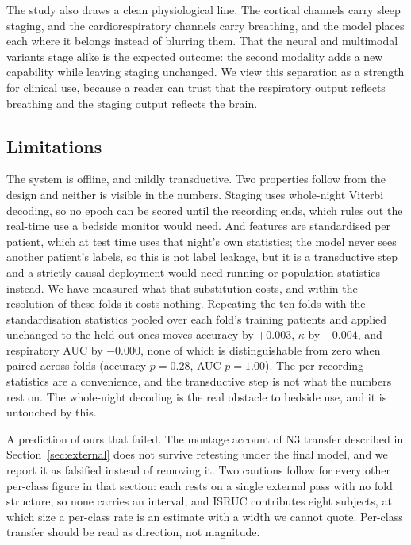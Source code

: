 \documentclass{ieeeaccess}
\begin{document}
The study also draws a clean physiological line. The cortical channels carry sleep staging, and
the cardiorespiratory channels carry breathing, and the model places each where it belongs
instead of blurring them. That the neural and multimodal variants stage alike is the expected
outcome: the second modality adds a new capability while leaving staging unchanged. We view this separation as a strength for
clinical use, because a reader can trust that the respiratory output reflects breathing and the
staging output reflects the brain.

\subsection{Limitations}
\label{sec:limitations}
The system is offline, and mildly transductive. Two properties follow from
the design and neither is visible in the numbers. Staging uses whole-night Viterbi decoding,
so no epoch can be scored until the recording ends, which rules out the real-time use a
bedside monitor would need. And features are standardised per patient, which at test time uses
that night's own statistics; the model never sees another patient's labels, so this is not
label leakage, but it is a transductive step and a strictly causal deployment would need
running or population statistics instead. We have measured what that substitution costs,
and within the resolution of these folds it costs nothing. Repeating the ten folds with
the standardisation statistics pooled over each fold's training patients and applied
unchanged to the held-out ones moves accuracy by $+0.003$, $\kappa$ by $+0.004$, and
respiratory AUC by $-0.000$, none of which is distinguishable from zero when paired
across folds (accuracy $p=0.28$, AUC $p=1.00$). The per-recording statistics are a
convenience, and the transductive step is not what the numbers rest
on. The whole-night decoding is the real obstacle to bedside use, and it is untouched by
this.

A prediction of ours that failed. The montage account of N3 transfer described in
Section~\ref{sec:external} does not survive retesting under the final model, and we report
it as falsified instead of removing it. Two cautions follow for every other per-class
figure in that section: each rests on a single external pass with no fold structure, so
none carries an interval, and ISRUC contributes eight subjects, at which size a per-class
rate is an estimate with a width we cannot quote. Per-class transfer should be read as
direction, not magnitude.
\end{document}
